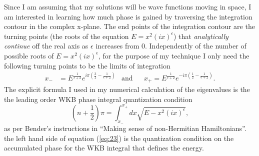 \documentclass[10pt, a4paper, singlespacing, headsepline]{article}
\begin{document}
Since I am assuming that my solutions will be wave functions moving in space, I am interested in learning how much phase is gained by traversing the integration contour in the complex x-plane. The end points of the integration contour are the turning points (the roots of the equation $E = x^2(ix)^{\epsilon}$) that \textit{analytically continue} off the real axis as $\epsilon$ increases from $0$\cite{BenderPT}\cite{Bender}. Independently of the number of possible roots of $E = x^2(ix)^{\epsilon}$, for the purpose of my technique I only need the following turning points to be the limits of integration
\begin{align} \label{eq:22}
x_{-}& = 
E^{\frac{1}{\epsilon + 2}}
e^{i\pi(\frac{3}{2} - \frac{1}{\epsilon + 2})}
&\mathrm{and}&
&x_{+} = E^{\frac{1}{\epsilon + 2}} e^{-i\pi(\frac{1}{2} - \frac{1}{\epsilon + 2})}.
\end{align}
The explicit formula I used in my numerical calculation of the eigenvalues is the the leading order WKB phase integral quantization condition 
\begin{equation} \label{eq:23}
\left (n +\frac{1}{2}\right )\pi = \int^{x_{+}}_{x_{-}}dx \sqrt{E - x^2(ix)^{\epsilon}},
\end{equation}
as per Bender's instructions in ``Making sense of non-Hermitian Hamiltonians''. the left hand side of equation (\ref{eq:23}) is the quantization condition on the accumulated phase for the WKB integral that defines the energy.\\
\end{document}
